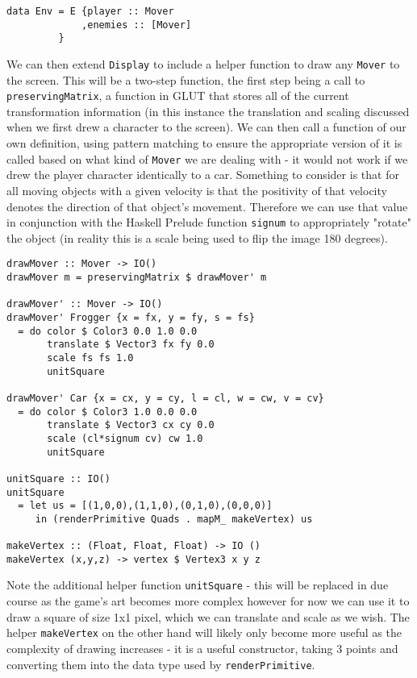 \documentclass[12pt, a4paper]{report}
\begin{document}
\begin{lstlisting}
data Env = E {player :: Mover
             ,enemies :: [Mover]
         }
\end{lstlisting}

We can then extend \verb|Display| to include a helper function to draw any \verb|Mover| to the screen.
This will be a two-step function, the first step being a call to \verb|preservingMatrix|, a function in GLUT that stores all of the current transformation information (in this instance the translation and scaling discussed when we first drew a character to the screen).
We can then call a function of our own definition, using pattern matching to ensure the appropriate version of it is called based on what kind of \verb|Mover| we are dealing with - it would not work if we drew the player character identically to a car.
Something to consider is that for all moving objects with a given velocity is that the positivity of that velocity denotes the direction of that object's movement.
Therefore we can use that value in conjunction with the Haskell Prelude function \verb|signum| to appropriately "rotate" the object (in reality this is a scale being used to flip the image 180 degrees).

\begin{lstlisting}
drawMover :: Mover -> IO()
drawMover m = preservingMatrix $ drawMover' m

drawMover' :: Mover -> IO()
drawMover' Frogger {x = fx, y = fy, s = fs}
  = do color $ Color3 0.0 1.0 0.0
       translate $ Vector3 fx fy 0.0
       scale fs fs 1.0
       unitSquare

drawMover' Car {x = cx, y = cy, l = cl, w = cw, v = cv}
  = do color $ Color3 1.0 0.0 0.0
       translate $ Vector3 cx cy 0.0
       scale (cl*signum cv) cw 1.0
       unitSquare

unitSquare :: IO()
unitSquare
  = let us = [(1,0,0),(1,1,0),(0,1,0),(0,0,0)]
     in (renderPrimitive Quads . mapM_ makeVertex) us

makeVertex :: (Float, Float, Float) -> IO ()
makeVertex (x,y,z) -> vertex $ Vertex3 x y z
\end{lstlisting}

Note the additional helper function \verb|unitSquare| - this will be replaced in due course as the game's art becomes more complex however for now we can use it to draw a square of size 1x1 pixel, which we can translate and scale as we wish.
The helper \verb|makeVertex| on the other hand will likely only become more useful as the complexity of drawing increases - it is a useful constructor, taking 3 points and converting them into the data type used by \verb|renderPrimitive|.
\end{document}
